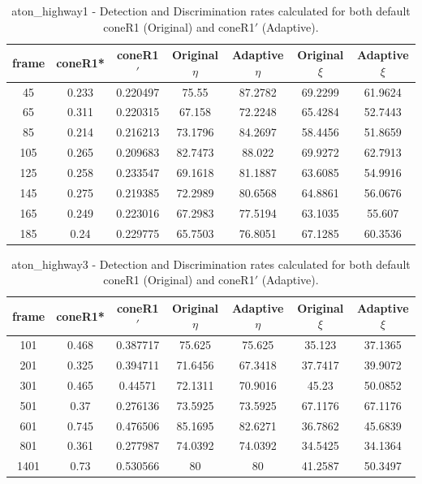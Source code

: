 \begin{appendices}
\begin{table}
\centering
\caption{aton\_highway1 - Detection and Discrimination rates calculated for both default coneR1 (Original) and coneR1$'$ (Adaptive).}
\begin{tabular}{ |c|c|c|c|c|c|c| }
\hline
\textbf{frame} &  \textbf{coneR1*} &  \textbf{coneR1$'$} &  \textbf{Original $\eta$} &  \textbf{Adaptive $\eta$} &  \textbf{Original $\xi$} &  \textbf{Adaptive $\xi$} \\
\hline
\hline
45 &  0.233 &  0.220497 &  75.55 &  87.2782 &  69.2299 &  61.9624 \\
\hline
65 &  0.311 &  0.220315 &  67.158 &  72.2248 &  65.4284 &  52.7443 \\
\hline
85 &  0.214 &  0.216213 &  73.1796 &  84.2697 &  58.4456 &  51.8659 \\
\hline
105 &  0.265 &  0.209683 &  82.7473 &  88.022 &  69.9272 &  62.7913 \\
\hline
125 &  0.258 &  0.233547 &  69.1618 &  81.1887 &  63.6085 &  54.9916 \\
\hline
145 &  0.275 &  0.219385 &  72.2989 &  80.6568 &  64.8861 &  56.0676 \\
\hline
165 &  0.249 &  0.223016 &  67.2983 &  77.5194 &  63.1035 &  55.607 \\
\hline
185 &  0.24 &  0.229775 &  65.7503 &  76.8051 &  67.1285 &  60.3536 \\
\hline
\end{tabular}

\end{table}

\begin{table}
\centering
\caption{aton\_highway3 - Detection and Discrimination rates calculated for both default coneR1 (Original) and coneR1$'$ (Adaptive).}
\begin{tabular}{ |c|c|c|c|c|c|c| }
\hline
\textbf{frame} &  \textbf{coneR1*} &  \textbf{coneR1$'$} &  \textbf{Original $\eta$} &  \textbf{Adaptive $\eta$} &  \textbf{Original $\xi$} &  \textbf{Adaptive $\xi$} \\
\hline
101 &  0.468 &  0.387717 &  75.625 &  75.625 &  35.123 &  37.1365 \\
\hline
201 &  0.325 &  0.394711 &  71.6456 &  67.3418 &  37.7417 &  39.9072 \\
\hline
301 &  0.465 &  0.44571 &  72.1311 &  70.9016 &  45.23 &  50.0852 \\
\hline
501 &  0.37 &  0.276136 &  73.5925 &  73.5925 &  67.1176 &  67.1176 \\
\hline
601 &  0.745 &  0.476506 &  85.1695 &  82.6271 &  36.7862 &  45.6839 \\
\hline
801 &  0.361 &  0.277987 &  74.0392 &  74.0392 &  34.5425 &  34.1364 \\
\hline
1401 &  0.73 &  0.530566 &  80 &  80 &  41.2587 &  50.3497 \\
\hline


\end{tabular}
\end{table}
\end{appendices}

